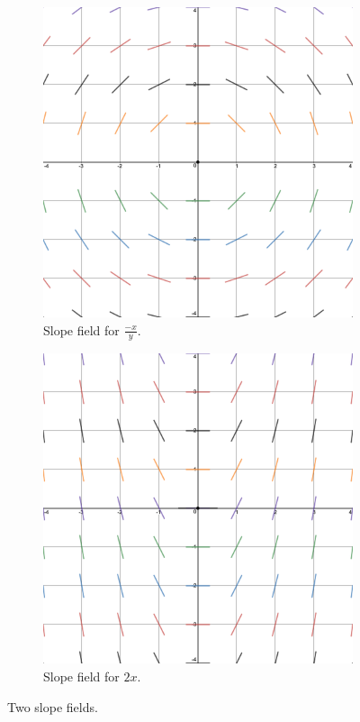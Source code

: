 \documentclass{article}
\begin{document}
\begin{figure}[h!]
    \centering
    \begin{subfigure}[b]{0.4\linewidth}
        \includegraphics[width=\linewidth]{Blender/SlopeField-10a.png}
        \caption{Slope field for $\tfrac{-x}{y}$.}
        \label{fig:2a}
    \end{subfigure}\hspace{3em}
    \begin{subfigure}[b]{0.4\linewidth}
        \includegraphics[width=\linewidth]{Blender/SlopeField-10b.png}
        \caption{Slope field for $2x$.}
        \label{fig:2b}
    \end{subfigure}
    \caption{Two slope fields.}
    \label{fig:2}
\end{figure}
\end{document}
